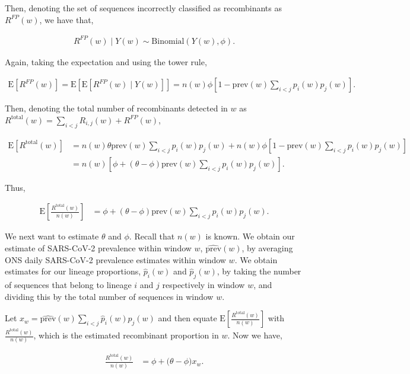 \documentclass[11pt,oneside,letterpaper]{article}
\begin{document}
Then, denoting the set of sequences incorrectly classified as recombinants as $R^{FP}(w)$, we have that,

\begin{align*}
R^{FP}(w)\mid Y(w)\sim\mathrm{Binomial}\left(Y(w),\phi\right).
\end{align*}

Again, taking the expectation and using the tower rule,

\begin{align*}
\mathrm{E}\left[R^{FP}(w)\right]
= \mathrm{E}\left[\mathrm{E}[R^{FP}(w)\mid Y(w)]\right] = n(w)\phi\left[1-\mathrm{prev}(w)\sum_{i<j}p_i(w)p_j(w)\right].
\end{align*}

Then, denoting the total number of recombinants detected in $w$ as $R^{\mathrm{total}}(w) = \sum_{i<j}R_{i,j}(w)+R^{FP}(w)$, 

\begin{align*}
\mathrm{E}\left[R^{\mathrm{total}}(w)\right]
&= n(w)\theta\mathrm{prev}(w)\sum_{i<j}{p_i(w)p_j(w)} + n(w)\phi\left[1-\mathrm{prev}(w)\sum_{i<j}p_i(w)p_j(w)\right] \\
&= n(w)\left[\phi + \left(\theta-\phi\right)\mathrm{prev}(w)\sum_{i<j}p_i(w)p_j(w)\right].
\end{align*}

Thus,

\begin{align*}
\mathrm{E}\left[\frac{R^{\mathrm{total}}(w)}{n(w)}\right]
&= \phi + \left(\theta-\phi\right)\mathrm{prev}(w)\sum_{i<j}p_i(w)p_j(w).
\end{align*}

We next want to estimate $\theta$ and $\phi$. Recall that $n(w)$ is known. We obtain our estimate of SARS-CoV-2 prevalence within window $w$, $\widehat{\text{prev}}(w)$, by averaging ONS daily SARS-CoV-2 prevalence estimates within window $w$. We obtain estimates for our lineage proportions, $\hat{p}_i(w)$ and $\hat{p}_j(w)$, by taking the number of sequences that belong to lineage $i$ and $j$ respectively in window $w$, and dividing this by the total number of sequences in window $w$. 

Let $x_w = \widehat{\text{prev}}(w)\sum_{i<j}\hat p_i(w) \hat p_j(w)$ and then equate $\mathrm{E}\left[\frac{R^{\mathrm{total}}(w)}{n(w)}\right]$ with $\frac{R^{\mathrm{total}}(w)}{n(w)}$, which is the estimated recombinant proportion in $w$. Now we have,

\begin{align*}
\frac{R^{\mathrm{total}}(w)}{n(w)}
&= \phi + \big(\theta -\phi \big)x_w.
\end{align*}
\end{document}
